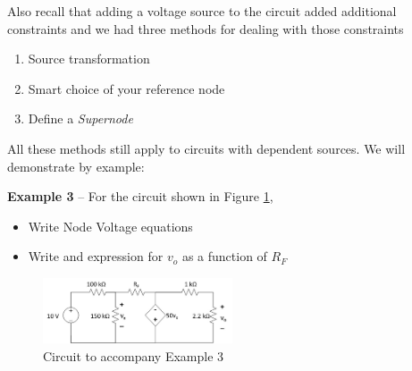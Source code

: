 \documentclass{handout}
\begin{document}
Also recall that adding a voltage source to the circuit added additional constraints and we had three methods for dealing with those constraints
\begin{enumerate}
	\item Source transformation
	\item Smart choice of your reference node
	\item Define a {\em Supernode}
\end{enumerate}

All these methods still apply to circuits with dependent sources.  We will demonstrate by example:


\textbf{Example 3} -- For the circuit shown in Figure \ref{fig: Example3},
\begin{itemize}
\item Write Node Voltage equations
\item Write and expression for $v_o$ as a function of $R_F$
\end{itemize}

\begin{figure}[h! t! b!]
	\centering
	\includegraphics[width=0.5\textwidth]{Example3.jpg}
	\caption{Circuit to accompany Example 3}
	\label{fig: Example3}
\end{figure}

\end{document}

